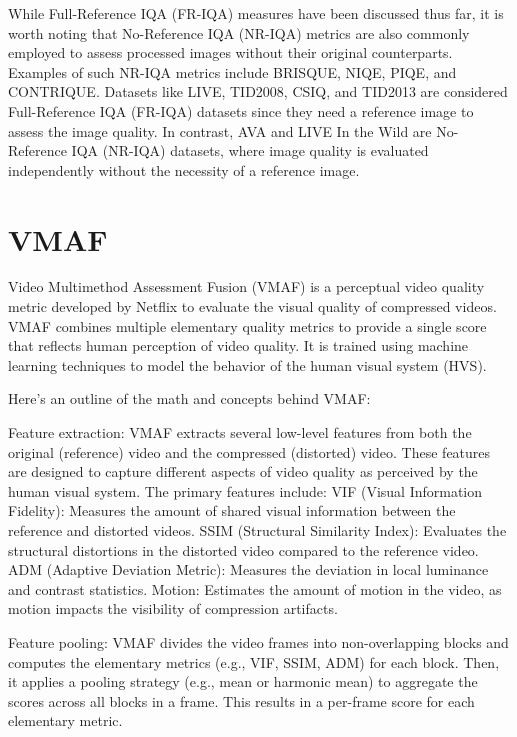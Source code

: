 While Full-Reference IQA (FR-IQA) measures have been discussed thus far, it is worth noting that No-Reference IQA (NR-IQA) metrics are also commonly employed to assess processed images without their original counterparts. Examples of such NR-IQA metrics include BRISQUE, NIQE, PIQE, and CONTRIQUE. Datasets like LIVE, TID2008, CSIQ, and TID2013 are considered Full-Reference IQA (FR-IQA) datasets since they need a reference image to assess the image quality. In contrast, AVA and LIVE In the Wild are No-Reference IQA (NR-IQA) datasets, where image quality is evaluated independently without the necessity of a reference image.

\section{VMAF}

Video Multimethod Assessment Fusion (VMAF) is a perceptual video quality metric developed by Netflix to evaluate the visual quality of compressed videos. VMAF combines multiple elementary quality metrics to provide a single score that reflects human perception of video quality. It is trained using machine learning techniques to model the behavior of the human visual system (HVS).

Here's an outline of the math and concepts behind VMAF:

    Feature extraction: VMAF extracts several low-level features from both the original (reference) video and the compressed (distorted) video. These features are designed to capture different aspects of video quality as perceived by the human visual system. The primary features include:
        VIF (Visual Information Fidelity): Measures the amount of shared visual information between the reference and distorted videos.
        SSIM (Structural Similarity Index): Evaluates the structural distortions in the distorted video compared to the reference video.
        ADM (Adaptive Deviation Metric): Measures the deviation in local luminance and contrast statistics.
        Motion: Estimates the amount of motion in the video, as motion impacts the visibility of compression artifacts.

    Feature pooling: VMAF divides the video frames into non-overlapping blocks and computes the elementary metrics (e.g., VIF, SSIM, ADM) for each block. Then, it applies a pooling strategy (e.g., mean or harmonic mean) to aggregate the scores across all blocks in a frame. This results in a per-frame score for each elementary metric.

